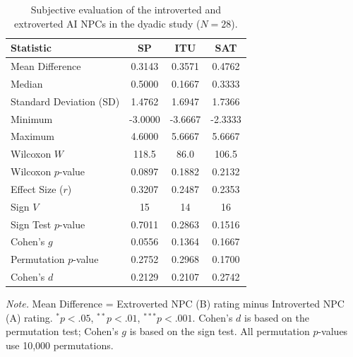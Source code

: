 \documentclass[a4paper,fleqn]{cas-sc}
\begin{document}
\begin{table}[t]
\centering
\caption{Subjective evaluation of the introverted and extroverted AI NPCs in the dyadic study ($N=28$).}
\label{tab:pair_user_results}
\begin{tabular}{lccc}
\toprule
\textbf{Statistic} & \textbf{SP} & \textbf{ITU} & \textbf{SAT} \\
\midrule
Mean Difference
& 0.3143 & 0.3571 & 0.4762 \\

Median
& 0.5000 & 0.1667 & 0.3333 \\

Standard Deviation (SD)
& 1.4762 & 1.6947 & 1.7366 \\

Minimum
& -3.0000 & -3.6667 & -2.3333 \\

Maximum
& 4.6000 & 5.6667 & 5.6667 \\

\midrule
Wilcoxon $W$
& 118.5 & 86.0 & 106.5 \\

Wilcoxon $p$-value
& 0.0897 & 0.1882 & 0.2132 \\

Effect Size ($r$)
& 0.3207 & 0.2487 & 0.2353 \\

\midrule
Sign $V$
& 15 & 14 & 16 \\

Sign Test $p$-value
& 0.7011 & 0.2863 & 0.1516 \\

Cohen's $g$
& 0.0556 & 0.1364 & 0.1667 \\

\midrule
Permutation $p$-value
& 0.2752 & 0.2968 & 0.1700 \\

Cohen's $d$
& 0.2129 & 0.2107 & 0.2742 \\
\bottomrule
\end{tabular}

\vspace{2mm}
\begin{minipage}{0.98\textwidth}
\footnotesize
\textit{Note.} Mean Difference = Extroverted NPC (B) rating minus Introverted NPC (A) rating.
$^{*}p < .05$, $^{**}p < .01$, $^{***}p < .001$.
Cohen's $d$ is based on the permutation test; Cohen's $g$ is based on the sign test.
All permutation $p$-values use 10,000 permutations.
\end{minipage}
\end{table}
\end{document}
